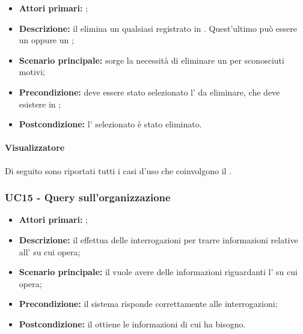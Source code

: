 \documentclass[casi-duso]{subfiles}
\begin{document}
\begin{itemize}
  \item \textbf{Attori primari:} ;
  \item \textbf{Descrizione:} il  elimina un qualsiasi  registrato in . Quest'ultimo può essere un  oppure un ;
  \item \textbf{Scenario principale:} sorge la necessità di eliminare un  per sconosciuti motivi;
  \item \textbf{Precondizione:} deve essere stato selezionato l' da eliminare, che deve esistere in ;
  \item \textbf{Postcondizione:} l' selezionato è stato eliminato.

\end{itemize}



\paragraph{Visualizzatore}
Di seguito sono riportati tutti i casi d'uso che coinvolgono il  .


\subsubsection{UC15 - Query sull'organizzazione}
\label{subsub:UC15}

\begin{itemize}
  \item \textbf{Attori primari:} ;
  \item \textbf{Descrizione:} il  effettua delle interrogazioni per trarre informazioni relative all' su cui opera;
  \item \textbf{Scenario principale:} il  vuole avere delle informazioni riguardanti l' su cui opera;
  \item \textbf{Precondizione:} il sistema risponde correttamente alle interrogazioni;
  \item \textbf{Postcondizione:} il  ottiene le informazioni di cui ha bisogno.

\end{itemize}
\end{document}
